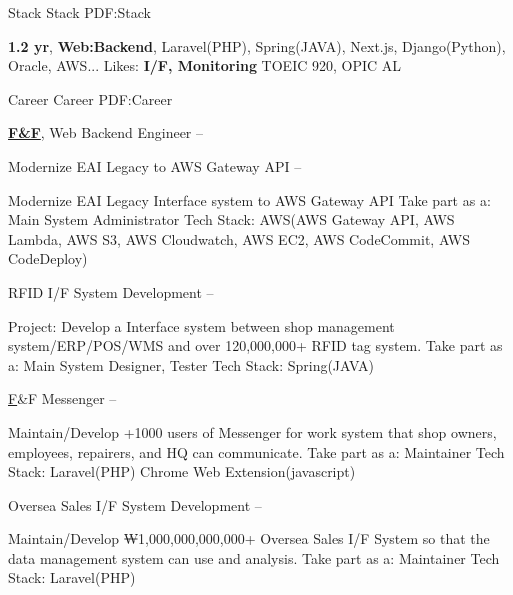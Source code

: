 \documentclass[letterpaper,MMMyyyy,nonstopmode]{simpleresumecv}
\begin{document}
\begin{Body}


\Section
{Stack}
{Stack}
{PDF:Stack}

\Entry
{\textbf{1.2 yr}},
{\textbf{Web:Backend}},
Laravel(PHP), Spring(JAVA), Next.js, Django(Python), Oracle, AWS...
\Gap
Likes: {\textbf{I/F, Monitoring}}
\Gap
TOEIC 920, OPIC AL



\Section
{Career}
{Career}
{PDF:Career}

\Entry
\href{http://fnf.co.kr}
{\textbf{F\&F}},
Web Backend Engineer
\hfill
{} --

\Gap
\BulletItem
Modernize EAI Legacy to AWS Gateway API
\hfill
{} --
\begin{Detail}
\SubBulletItem
Modernize EAI Legacy Interface system to AWS Gateway API
\SubBulletItem
Take part as a:
Main System Administrator
\SubBulletItem
Tech Stack:
AWS(AWS Gateway API, AWS Lambda, AWS S3, AWS Cloudwatch, AWS EC2, AWS CodeCommit, AWS CodeDeploy)
\end{Detail}

\Gap
\BulletItem
RFID I/F System Development
\hfill
{} --
\begin{Detail}
\SubBulletItem
Project: Develop a Interface system between shop management system/ERP/POS/WMS and over 120,000,000+ RFID tag system.
\SubBulletItem
Take part as a:
Main System Designer, Tester
\SubBulletItem
Tech Stack:
Spring(JAVA)
\end{Detail}

\Gap
\BulletItem
\href{https://chrome.google.com/webstore/detail/kepbfnehdhpgahllldhoncniilnlofcl}
F\&F Messenger
\hfill
{} --
\begin{Detail}
\SubBulletItem
Maintain/Develop +1000 users of Messenger for work system that shop owners, employees, repairers, and HQ can communicate.
\SubBulletItem
Take part as a:
Maintainer
\SubBulletItem
Tech Stack:
Laravel(PHP)
Chrome Web Extension(javascript)
\end{Detail}

\Gap
\BulletItem
Oversea Sales I/F System Development
\hfill
{} --
\begin{Detail}
\SubBulletItem
Maintain/Develop ₩1,000,000,000,000+ Oversea Sales I/F System so that the data management system can use and analysis.
\SubBulletItem
Take part as a:
Maintainer
\SubBulletItem
Tech Stack:
Laravel(PHP)
\end{Detail}


\end{Body}
\end{document}
